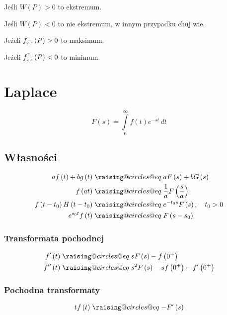 \documentclass[a4paper,12pt]{article}
\makeatletter
\newcommand{\odpowiada}{\mathrel{\mathpalette\raising@circles@eq\relax}}
\newcommand{\raising@circles@eq}[2]{%
  \vphantom{#1+}%
  \vbox{
    \settowidth\unitlength{$#1\mspace{2mu}$}%
    \offinterlineskip\m@th
    \ialign{##\cr
      \hfil\small@circle{#1}$#1\mspace{1.5mu}$\cr\noalign{\vskip0.5\unitlength}
      $#1=$\cr\noalign{\post@vskip{+}{#1}}
      $#1\mspace{1.5mu}$\small@circle{#1}\hfill\cr\noalign{\post@vskip{-}{#1}}
    }%
  }%
}
\newcommand{\small@circle}[1]{%
  \smash{%
    \begin{picture}(1,1)
    \small@linethickness{#1}
    \put(0.5,0.5){\circle{1}}
    \end{picture}%
  }%
}
\newcommand{\small@linethickness}[1]{%
  \linethickness{%
      \ifx#1\displaystyle 0.8\fontdimen8\textfont3\else
      \ifx#1\textstyle 0.8\fontdimen8\textfont3\else
      \ifx#1\scriptstyle0.8\fontdimen8\scriptfont3\else
      1\fontdimen8\scriptscriptfont3\fi\fi\fi
  }%
}
\newcommand{\post@vskip}[2]{%
  \expandafter\vskip\expanded{%
    #1\ifx#2\scriptscriptstyle0.9\else\ifx#2\scriptstyle0.6\else0.3\fi\fi\unitlength
  }%
}
\makeatother
\begin{document}
\begin{multicols}{2}
    Jeśli $W\left(P\right) > 0$ to ekstremum.

    Jeśli $W\left(P\right) < 0$ to nie ekstremum, w innym przypadku chuj wie.

    Jeżeli $f^"_{x x}\left(P\right) > 0$ to maksimum.

    Jeżeli $f^"_{x x}\left(P\right) < 0$ to minimum.

\section{Laplace}
    \[
        F\left(s\right) = \int \limits^\infty_0 f\left( t \right) e^{ - s t} \, dt
    \]

    \subsection*{Własności}

    \begin{align*}
        a f\left(t\right) + b g\left(t\right) &\odpowiada a F\left(s\right) + b G\left(s\right) \\
        f \left(a t\right) &\odpowiada \frac{1}{a} F \left(\frac{s}{a}\right) \\
        f \left(t - t_0 \right) H\left(t - t_0 \right) &\odpowiada e^{ - t_0 s} F\left(s\right), \quad t_0 > 0 \\
        e^{s_0 t} f \left( t \right) &\odpowiada F\left( s - s_0 \right) \\
    \end{align*}

    \subsubsection*{Transformata pochodnej}

    \begin{align*}
        f' \left( t \right) &\odpowiada s F \left( s \right) - f\left( 0^+ \right) \\
        f'' \left( t \right) &\odpowiada s^2 F\left(s \right) - sf \left( 0^+\right) - f'\left(0^+\right)
    \end{align*}

    \subsubsection*{Pochodna transformaty}

    \[
        t f \left( t \right) \odpowiada - F'\left(s\right)
    \]


\end{multicols}
\end{document}
